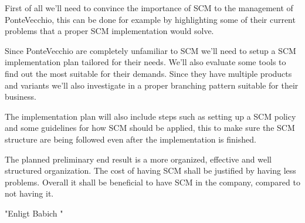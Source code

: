 \documentclass[10pt]{article}
\begin{document}
First of all we’ll need to convince the importance of SCM to the management of PonteVecchio, this can be done for example by highlighting some of their current problems that a proper SCM implementation would solve.

\noindent Since PonteVecchio are completely unfamiliar to SCM we’ll need to setup a SCM implementation plan tailored for their needs. We’ll also evaluate some tools to find out the most suitable for their demands. 
Since they have multiple products and variants we’ll also investigate in a proper branching pattern suitable for their business.

\noindent The implementation plan will also include steps such as setting up a SCM policy and some guidelines for how SCM should be applied, this to make sure the SCM structure are being followed even after the implementation is finished.

\noindent The planned preliminary end result is a more organized, effective and well structured organization. The cost of having SCM shall be justified by having less problems. Overall it shall be beneficial to have SCM in the company, compared to not having it.


"Enligt Babich \cite{Babich}"
\end{document}
